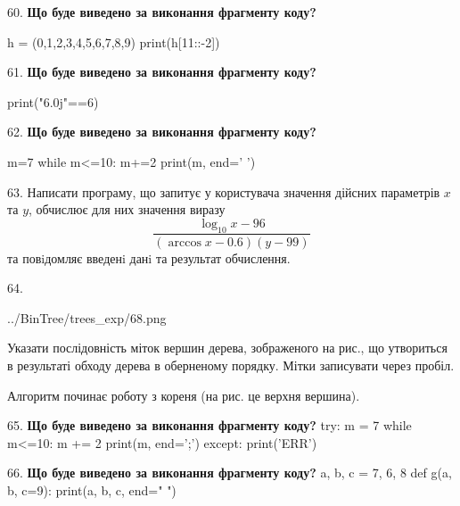 \documentclass[11pt]{article}
\begin{document}
60. \textbf{Що буде виведено за виконання фрагменту коду?}

h = (0,1,2,3,4,5,6,7,8,9)
print(h[11::-2])

\par\vspace{5mm}

61. \textbf{Що буде виведено за виконання фрагменту коду?}

print("6.0j"==6)
\par\vspace{5mm}

62. \textbf{Що буде виведено за виконання фрагменту коду?}

m=7
while m<=10:
    m+=2
print(m, end=' ')

\par\vspace{5mm}

63. 
Написати програму, що запитує у користувача значення дійсних параметрів $x$ та $y$, обчислює для них значення виразу 
$$\frac{\log_{10} x - 96}{(\arccos x - 0.6) (y - 99)}$$ 
та повiдомляє введенi данi та результат обчислення.

\par\vspace{5mm}

64. 

\begin{center}
	{../BinTree/trees_exp/68.png}
\end{center}
Указати послідовність міток вершин дерева, зображеного на рис., що утвориться в результаті обходу дерева в оберненому порядку. Мітки записувати через пробіл.\par Алгоритм починає роботу з кореня (на рис. це верхня вершина).
\par\vspace{5mm}

65. \textbf{Що буде виведено за виконання фрагменту коду?}
try:
    m = 7
    while m<=10:
        m += 2
    print(m, end=';')
except:
    print('ERR')
\par\vspace{5mm}

66. \textbf{Що буде виведено за виконання фрагменту коду?}
a, b, c = 7, 6, 8
def g(a, b, c=9):
    print(a, b, c, end=" ")
\end{document}
